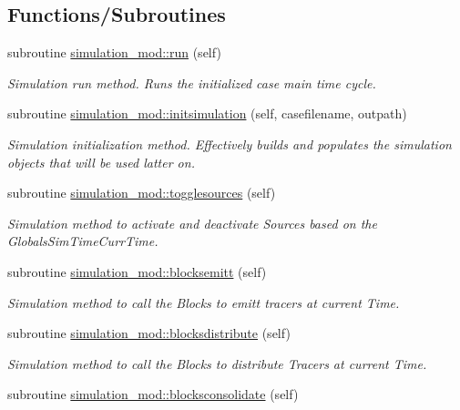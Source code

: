 \subsection*{Functions/\+Subroutines}
\begin{DoxyCompactItemize}
\item 
subroutine \mbox{\hyperlink{namespacesimulation__mod_a73bd78c4ac76c51f1e10f5847c25c4df}{simulation\+\_\+mod\+::run}} (self)
\begin{DoxyCompactList}\small\item\em Simulation run method. Runs the initialized case main time cycle. \end{DoxyCompactList}\item 
subroutine \mbox{\hyperlink{namespacesimulation__mod_aedbba2bb458cbcd7eb93938a5f7b5940}{simulation\+\_\+mod\+::initsimulation}} (self, casefilename, outpath)
\begin{DoxyCompactList}\small\item\em Simulation initialization method. Effectively builds and populates the simulation objects that will be used latter on. \end{DoxyCompactList}\item 
subroutine \mbox{\hyperlink{namespacesimulation__mod_a87a5141e4516b9610a6e4f0d2ff2d719}{simulation\+\_\+mod\+::togglesources}} (self)
\begin{DoxyCompactList}\small\item\em Simulation method to activate and deactivate Sources based on the GlobalsSim\+TimeCurr\+Time. \end{DoxyCompactList}\item 
subroutine \mbox{\hyperlink{namespacesimulation__mod_a13aa0745f4601e3f418143dab2f18276}{simulation\+\_\+mod\+::blocksemitt}} (self)
\begin{DoxyCompactList}\small\item\em Simulation method to call the Blocks to emitt tracers at current Time. \end{DoxyCompactList}\item 
subroutine \mbox{\hyperlink{namespacesimulation__mod_a058892630af07fc0fe8a4bffec531c6a}{simulation\+\_\+mod\+::blocksdistribute}} (self)
\begin{DoxyCompactList}\small\item\em Simulation method to call the Blocks to distribute Tracers at current Time. \end{DoxyCompactList}\item 
subroutine \mbox{\hyperlink{namespacesimulation__mod_a8390f0a56ff2678d144af1dd09517a5e}{simulation\+\_\+mod\+::blocksconsolidate}} (self)

\end{DoxyCompactItemize}
